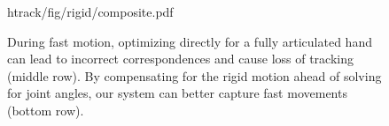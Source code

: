 \begin{figure}[t]
\centering
\begin{overpic} 
[width=\linewidth]
{htrack/fig/rigid/composite.pdf}
\putfilename
\end{overpic}
\caption{
%
% 
During fast motion, optimizing directly for a fully articulated hand can lead to incorrect correspondences and cause loss of tracking (middle row). By compensating for the rigid motion ahead of solving for joint angles, our system can better capture fast movements (bottom row).
% 
}
\label{fig:rigid}
\end{figure}